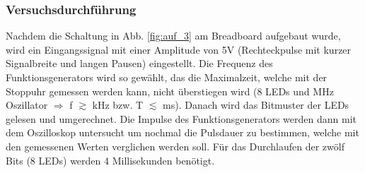 \documentclass[12pt,a4paper]{article}
\begin{document}
\subsubsection*{Versuchsdurchführung}

Nachdem die Schaltung  in Abb. \ref{fig:auf_3}  am Breadboard aufgebaut wurde, wird ein Eingangssignal mit einer Amplitude von 5V (Rechteckpulse mit kurzer Signalbreite und langen Pausen) eingestellt. Die Frequenz des Funktionsgenerators wird so gewählt, das die Maximalzeit, welche mit der Stoppuhr gemessen werden kann, nicht überstiegen wird (8 LEDs und \unit[1]{MHz} Oszillator $\Rightarrow$ f $\gtrsim$ \unit[4]{kHz} bzw. T $\lesssim$ \unit[0,25]{ms}). Danach wird das Bitmuster der LEDs gelesen und umgerechnet. Die Impulse des Funktionsgenerators werden dann mit dem Oszilloskop untersucht um nochmal die Pulsdauer zu bestimmen, welche mit den gemessenen Werten verglichen werden soll. Für das Durchlaufen der zwölf Bits (8 LEDs) werden 4 Millisekunden benötigt.
\end{document}
